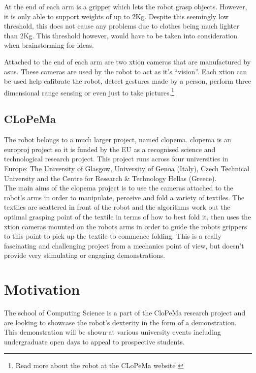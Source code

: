 \documentclass{l3proj}
\begin{document}
At the end of each arm is a gripper which lets the robot grasp objects. However, it is only able to support weights of up to 2Kg. Despite this seemingly low threshold, this does not cause any problems due to clothes being much lighter than 2Kg.  This threshold however, would have to be taken into consideration when brainstorming for ideas.

Attached to the end of each arm are two \gls{xtion} cameras that are manufactured by \gls{asus}. These cameras are used by the robot to act as it’s “vision”. Each \gls{xtion} can be used help calibrate the robot, detect gestures made by a person, perform three dimensional range sensing or even just to take pictures.\footnote{Read more about the robot at the CLoPeMa website \cite{robot-page}}

\subsection{CLoPeMa}
The robot belongs to a much larger project, named \acrshort{clopema}. \acrshort{clopema} is an \gls{europroj} project so it is funded by the EU as a recognised science and technological research project. This project runs across four universities in Europe: The University of Glasgow, University of Genoa (Italy), Czech Technical University and the Centre for Research \& Technology Hellas (Greece).\\
The main aims of the \acrshort{clopema} project is to use the cameras attached to the robot's arms in order to manipulate, perceive and fold a variety of textiles. The textiles are scattered in front of the robot and the algorithms work out the optimal grasping point of the textile in terms of how to best fold it, then uses the \gls{xtion} cameras mounted on the robots arms in order to guide the robots grippers to this point to pick up the textile to commence folding. This is a really fascinating and challenging project from a mechanics point of view, but doesn't provide very stimulating or engaging demonstrations.

\section{Motivation}
The school of Computing Science is a part of the CloPeMa research project and are looking to showcase the robot's dexterity in the form of a demonstration. This demonstration will be shown at various university events including undergraduate open days to appeal to prospective students.
\end{document}
